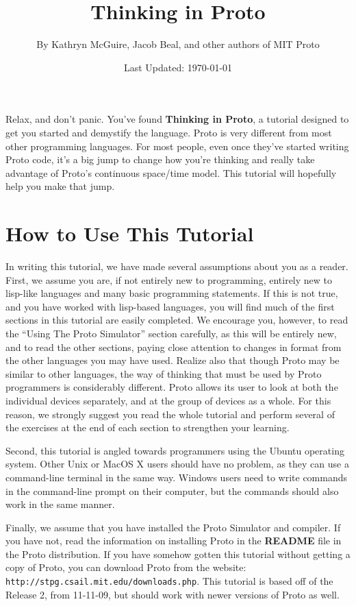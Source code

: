 \documentclass{article}
\title{Thinking in Proto}
\author{By Kathryn McGuire, Jacob Beal, and other authors of MIT Proto}
\date{Last Updated: \today}
\begin{document}
\maketitle

Relax, and don't panic.  You've found {\bf Thinking in Proto}, a
tutorial designed to get you started and demystify the language.
Proto is very different from most other programming languages.  For
most people, even once they've started writing Proto code, it's a big
jump to change how you're thinking and really take advantage of
Proto's continuous space/time model.  This tutorial will hopefully
help you make that jump.

\tableofcontents




\section{How to Use This Tutorial}
	
In writing this tutorial, we have made several assumptions about you
as a reader.  First, we assume you are, if not entirely new to
programming, entirely new to lisp-like languages and many basic
programming statements.  If this is not true, and you have worked with
lisp-based languages, you will find much of the first sections in this
tutorial are easily completed.  We encourage you, however, to read the
``Using The Proto Simulator'' section carefully, as this will be
entirely new, and to read the other sections, paying close attention
to changes in format from the other languages you may have used.
Realize also that though Proto may be similar to other languages, the
way of thinking that must be used by Proto programmers is considerably
different.  Proto allows its user to look at both the individual
devices separately, and at the group of devices as a whole.  For this
reason, we strongly suggest you read the whole tutorial and perform
several of the exercises at the end of each section to strengthen your
learning.

Second, this tutorial is angled towards programmers using the Ubuntu
operating system.  Other Unix or MacOS X users should have no problem,
as they can use a command-line terminal in the same way.  Windows
users need to write commands in the command-line prompt on their
computer, but the commands should also work in the same manner.

Finally, we assume that you have installed the Proto Simulator and
compiler.  If you have not, read the information on installing Proto
in the {\bf README} file in the Proto distribution.  If you have
somehow gotten this tutorial without getting a copy of Proto, you can
download Proto from the website: {\tt
  http://stpg.csail.mit.edu/downloads.php}.  This tutorial is based
off of the Release 2, from 11-11-09, but should work with newer versions
of Proto as well.
\end{document}
